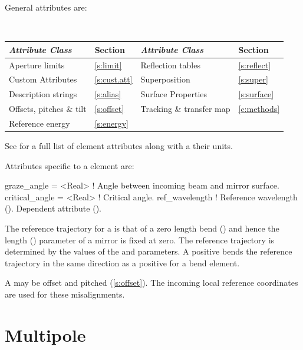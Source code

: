 {General  attributes are:
\begin{center}
\tt 
\begin{tabular}{llll} \toprule
  {\sl Attribute Class}      & Section           & {\sl Attribute Class}      & Section         \\ \midrule
  Aperture limits            & \ref{s:limit}     & Reflection tables          & \ref{s:reflect} \\
  Custom Attributes          & \ref{s:cust.att}  & Superposition              & \ref{s:super}   \\
  Description strings        & \ref{s:alias}     & Surface Properties         & \ref{s:surface} \\
  Offsets, pitches \& tilt   & \ref{s:offset}    & Tracking \& transfer map   & \ref{c:methods} \\ 
  Reference energy           & \ref{s:energy}    &                            &                 \\
  \bottomrule
\end{tabular}
\end{center}
\toffset
See  for a full list of element attributes along with a their units.

Attributes specific to a  element are:
\begin{example}
  graze_angle     = <Real>   ! Angle between incoming beam and mirror surface.
  critical_angle  = <Real>   ! Critical angle.
  ref_wavelength             ! Reference wavelength (). Dependent attribute ().
\end{example}

The reference trajectory for a
 is that of a zero length bend () and
hence the length () parameter of a mirror is fixed at zero. The
reference trajectory is determined by the values of the
 and  parameters. A positive 
bends the reference trajectory in the same direction as a positive
 for a bend element.

A  may be offset and pitched (\ref{s:offset}). The incoming
local reference coordinates are used for these misalignments.

\newpage

\section{Multipole}
\label{s:mult}

}
